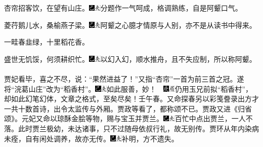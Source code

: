 杏帘招客饮，在望有山庄。{\includegraphics[width=3mm]{../Images/00003}\includegraphics[width=3mm]{../Images/00012}\footnotesize \kaishu 分题作一气呵成，格调熟练，自是阿颦口气。}

菱荇鹅儿水，桑榆燕子梁。{\includegraphics[width=3mm]{../Images/00003}\includegraphics[width=3mm]{../Images/00012}\footnotesize \kaishu 阿颦之心臆才情原与人别，亦不是从读书中得来。}

一畦春韭绿，十里稻花香。

盛世无饥馁，何须耕织忙。{\includegraphics[width=3mm]{../Images/00003}\includegraphics[width=3mm]{../Images/00012}\footnotesize \kaishu 以幻入幻，顺水推舟，且不失应制，所以称阿颦。}
\\
\\
\indent
贾妃看毕，喜之不尽，说：“果然进益了！”又指“杏帘”一首为前三首之冠。遂将“浣葛山庄”改为“稻香村”。{\includegraphics[width=3mm]{../Images/00003}\includegraphics[width=3mm]{../Images/00012}\footnotesize \kaishu 如此服善，妙！　{\includegraphics[width=3mm]{../Images/00004}\includegraphics[width=3mm]{../Images/00010}\footnotesize \kaishu 仍用玉兄前拟“稻香村”，却如此幻笔幻体，文章之格式，至矣尽矣！壬午春。}}又命探春另以彩笺誊录出方才一共十数首诗，出令太监传与外厢。贾政等看了，都称颂不已。贾政又进《归省颂》。元妃又命以琼酥金脍等物，赐与宝玉并贾兰。{\includegraphics[width=3mm]{../Images/00003}\includegraphics[width=3mm]{../Images/00012}\footnotesize \kaishu 百忙中点出贾兰，一人不落。}此时贾兰极幼，未达诸事，只不过随母依叔行礼，故无别传。贾环从年内染病未痊，自有闲处调养，故亦无传。{\includegraphics[width=3mm]{../Images/00003}\includegraphics[width=3mm]{../Images/00012}\footnotesize \kaishu 补明，方不遗失。}

